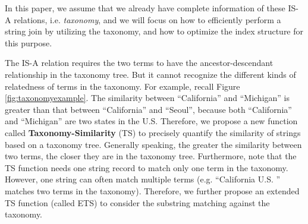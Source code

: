 


In this paper, we assume that we already have complete
information of these IS-A relations, i.e. \textit{taxonomy}, and we will focus on how
to efficiently perform a string join by utilizing the taxonomy, and how to optimize the index structure
for this purpose.









The IS-A relation requires the two terms to have the ancestor-descendant relationship in the taxonomy tree. But it cannot recognize the different kinds of relatedness of terms in the taxonomy. For example, recall Figure \ref{fig:taxonomyexample}. The similarity between ``\textsf{California}'' and ``\textsf{Michigan}'' is greater than that between ``\textsf{California}'' and ``\textsf{Seoul}'', because  both ``\textsf{California}'' and ``\textsf{Michigan}'' are two states in the U.S. Therefore, we propose a new function called \textbf{Taxonomy-Similarity} (TS) to precisely quantify the similarity of strings based on a taxonomy tree. Generally speaking,  the greater the similarity between two terms, the closer they are in the taxonomy tree.  Furthermore, note that the TS function needs one string record to  match only one term in the taxonomy. However, one string can often match multiple terms (e.g. ``\textsf{California U.S.} '' matches two terms in the taxonomy). Therefore, we further propose an extended TS function (called ETS) to  consider the substring matching against the taxonomy.



